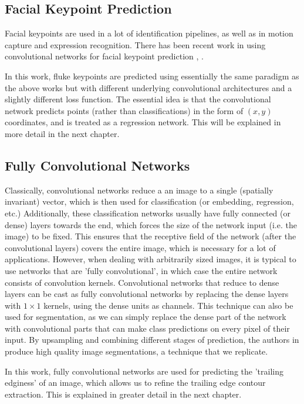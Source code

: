 \subsection{Facial Keypoint Prediction}

Facial keypoints are used in a lot of identification pipelines, as well as in motion capture and expression recognition.
There has been recent work in using convolutional networks for facial keypoint prediction \cite{sun2013deep}, \cite{nouri2014using}. 

In this work, fluke keypoints are predicted using essentially the same paradigm  as the above works but with different underlying convolutional architectures and a slightly different loss function.
The essential idea is that the convolutional network predicts points (rather than classifications) in the form of $(x, y)$ coordinates, and is treated as a regression network.
This will be explained in more detail in the next chapter.

\subsection{Fully Convolutional Networks}

Classically, convolutional networks reduce a an image to a single (spatially invariant) vector, which is then used for classification (or embedding, regression, etc.)
Additionally, these classification networks usually have fully connected (or dense) layers towards the end, which forces the size of the network input (i.e. the image) to be fixed.
This ensures that the receptive field of the network (after the convolutional layers) covers the entire image, which is necessary for a lot of applications.
However, when dealing with arbitrarily sized images, it is typical to use networks that are 'fully convolutional', in which case the entire network consists of convolution kernels. 
Convolutional networks that reduce to dense layers can be cast as fully convolutional networks by replacing the dense layers with $1\times1$ kernels, using the dense units as channels.
This technique can also be used for segmentation, as we can simply replace the dense part of the network with convolutional parts that can make class predictions on every pixel of their input.
By upsampling and combining different stages of prediction, the authors in \cite{long2015fully} produce high quality image segmentations, a technique that we replicate.

In this work, fully convolutional networks are used for predicting the 'trailing edginess' of an image, which allows us to refine the trailing edge contour extraction. 
This is explained in greater detail in the next chapter.

